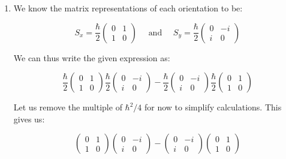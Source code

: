 \begin{enumerate}
    $$\boxed{x_{A}=\left( \begin{matrix} 1\\0\\0\end{matrix} \right),\frac{1}{\sqrt{2}}\left( \begin{matrix}0 \\1\\1\end{matrix}\right),\frac{1}{\sqrt{2}}\left( \begin{matrix} 0\\-1\\1\end{matrix} \right) \right)}$$

  \item We know the matrix representations of each orientation to be:

    $$S_x=\frac{\hbar}{2}\left( \begin{matrix} 0 & 1\\ 1 & 0\end{matrix} \right)\quad\text{ and }\quad S_y=\frac{\hbar}{2}\left( \begin{matrix} 0 & -i\\i & 0\end{matrix} \right)$$

    We can thus write the given expression as:

    $$\frac{\hbar}{2}\left( \begin{matrix} 0 & 1\\ 1 & 0\end{matrix} \right)\frac{\hbar}{2}\left( \begin{matrix} 0 & -i\\i & 0\end{matrix} \right)-\frac{\hbar}{2}\left( \begin{matrix} 0 & -i\\i & 0\end{matrix} \right)\frac{\hbar}{2}\left( \begin{matrix} 0 & 1\\ 1 & 0\end{matrix} \right)$$

    Let us remove the multiple of $\hbar^2/4$ for now to simplify calculations. This gives us:

    $$\left( \begin{matrix} 0 & 1\\ 1 & 0\end{matrix} \right)\left( \begin{matrix} 0 & -i\\i & 0\end{matrix} \right)-\left( \begin{matrix} 0 & -i\\i & 0\end{matrix} \right)\left( \begin{matrix} 0 & 1\\ 1 & 0\end{matrix} \right)$$


\end{enumerate}
